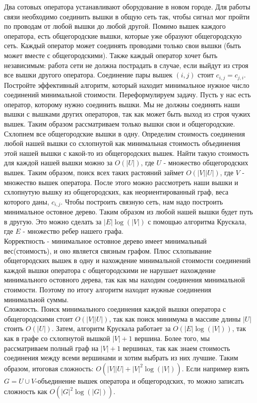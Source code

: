 \documentclass[12pt]{extreport}
\theoremstyle{definiton}
\theoremstyle{definition}
\theoremstyle{definition}
\begin{document}
	\Pr[4]  Два сотовых оператора устанавливают оборудование в новом городе. Для работы связи необходимо соединить вышки в общую сеть так, чтобы сигнал мог пройти по проводам от любой вышки до любой другой. Помимо вышек каждого оператора, есть общегородские вышки, которые уже образуют общегородскую сеть. Каждый оператор может соединять проводами только свои вышки (быть может вместе с общегородскими). Также каждый оператор хочет быть независимым: работа сети не должна пострадать в случае, если выйдут из строя все вышки другого оператора. Соединение пары вышек $(i,j)$ стоит $c_{i,j}=c_{j,i}$. Постройте эффективный алгоритм, который находит минимальное нужное число соединений минимальной стоимости.
    \newline
    Переформулируем задачу. Пусть у нас есть оператор, которому нужно соединить вышки. Мы не должны соединять наши вышки с вышками других операторов, так как может быть выход из строя чужих вышек. Таким образом рассматриваем только вышки свои и общегородские. Схлопнем все общегородские вышки в одну. Определим стоимость соединения любой нашей вышки со схлопнутой как минимальная стоимость объединения этой нашей вышки с какой-то из общегородских вышек. Найти такую стоимость для каждой нашей вышки можно за $O(|U|)$, где $U$ - множество общегородских вышек. Таким образом, поиск всех таких растояний займет $O(|V||U|)$, где $V$ - множество вышек оператора. После этого можно рассмотреть наши вышки и схлопнутую вышку из общегородских, как неориентированный граф, веса которого даны, $c_{i,j}$. Чтобы построить связную сеть, нам надо построить минимальное остовное дерево. Таким образом из любой нашей вышки будет путь в другую. Это можно сделать за $|E|\log(|V|)$ с помощью алгоритма Крускала, где $E$ - множество ребер нашего графа.\\
    Корректность - минимальное остовное дерево имеет минимальный вес(стоимость), и оно является связным графом. Плюс схлопывание общегородских вышек в одну и нахождение минимальной стоимости соединений каждой вышки оператора с общегородскими не нарушает нахождение минимального остовного дерева, так как мы находим соединения минимальной стоимости. Поэтому по итогу алгоритм находит нужные соединения минимальной суммы.\\
    Сложность. Поиск минимального соединения каждой вышки оператора с общегородскими стоит $O(|V||U|)$, так как поиск минимума в массиве длины $|U|$ стоить $O(|U|)$. Затем, алгоритм Крускала работает за $O(|E|\log(|V|))$, так как в графе со схлопнутой вышкой $|V|+1$ вершина. Более того, мы рассматриваем полный граф на $|V|+1$ вершинах, так как знаем стоимость соединения между всеми вершинами и хотим выбрать из них лучшие. Таким образом, итоговая сложность: $O(|V||U| + |V|^2\log(|V|))$. Если например взять $G = U \cup V$-объединение вышек оператора и общегородских, то можно записать сложность как $O(|G|^2\log(|G|))$.
	
\end{document}

